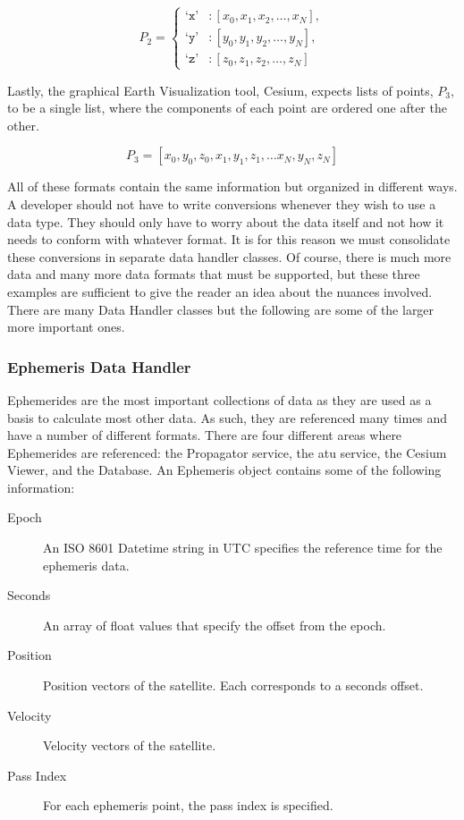 \begin{equation*}
    P_2 = 
    \left\{
    \begin{aligned}
	\texttt{`x'}&: [x_0, x_1, x_2, \ldots, x_N],  \\
	\texttt{`y'}&: [y_0, y_1, y_2, \ldots, y_N],  \\
	\texttt{`z'}&: [z_0, z_1, z_2, \ldots, z_N]
    \end{aligned}
    \right.
\end{equation*}

Lastly, the graphical Earth Visualization tool, Cesium, expects lists of
points, $P_3$, to be a single list, where the components of each point are
ordered one after the other.

\begin{equation*}
    P_3 = \left[ x_0, y_0, z_0, x_1, y_1, z_1, \ldots x_N, y_N, z_N \right]
\end{equation*}

All of these formats contain the same information but organized in different
ways.  A developer should not have to write conversions whenever they wish to
use a data type.  They should only have to worry about the data itself and not
how it needs to conform with whatever format. It is for this reason we must
consolidate these conversions in separate data handler classes.  Of course,
there is much more data and many more data formats that must be supported, but
these three examples are sufficient to give the reader an idea about the
nuances involved. There are many Data Handler classes but the following are
some of the larger more important ones.


\subsubsection{Ephemeris Data Handler}

Ephemerides are the most important collections of data as they are used as a
basis to calculate most other data. As such, they are referenced many times and
have a number of different formats. There are four different areas where
Ephemerides are referenced: the Propagator service, the \gls{atu} service, the
Cesium Viewer, and the Database. An Ephemeris object contains some of the
following information:

\begin{description}

    \item[Epoch] An ISO 8601 Datetime string in UTC specifies the reference
	time for the ephemeris data.

    \item[Seconds] An array of float values that specify the offset from the
	epoch.

    \item[Position] Position vectors of the satellite. Each corresponds to a
	seconds offset.

    \item[Velocity] Velocity vectors of the satellite. 

    \item[Pass Index] For each ephemeris point, the pass index is specified. 

\end{description}


